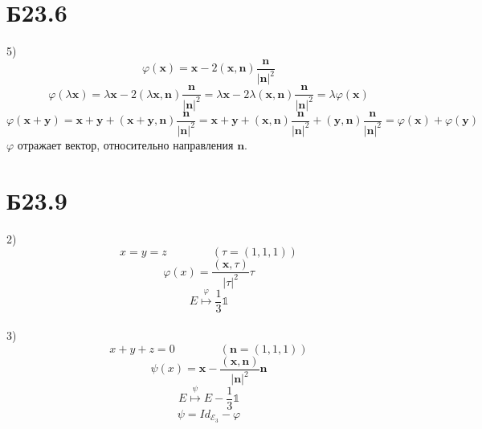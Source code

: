 \documentclass[a4paper,12pt]{article} %
\begin{document}
\section*{Б23.6}5)
$$\varphi(\textbf{x})=\textbf{x}-2(\textbf{x},\textbf{n})\frac{\textbf{n}}{|\textbf{n}|^2}$$
$$\varphi(\lambda\textbf{x})=\lambda\textbf{x}-2(\lambda\textbf{x},\textbf{n})\frac{\textbf{n}}{|\textbf{n}|^2}=\lambda\textbf{x}-2\lambda(\textbf{x},\textbf{n})\frac{\textbf{n}}{|\textbf{n}|^2}=\lambda\varphi(\textbf{x})$$
$$\varphi(\textbf{x}+\textbf{y})=\textbf{x}+\textbf{y}+(\textbf{x}+\textbf{y},\textbf{n})\frac{\textbf{n}}{|\textbf{n}|^2}=\textbf{x}+\textbf{y}+(\textbf{x},\textbf{n})\frac{\textbf{n}}{|\textbf{n}|^2}+(\textbf{y},\textbf{n})\frac{\textbf{n}}{|\textbf{n}|^2}=\varphi(\textbf{x})+\varphi(\textbf{y})$$
$\varphi$ отражает вектор, относительно направления $\textbf{n}$.
\section*{Б23.9}
2)$$x=y=z\qquad\qquad (\tau=(1,1,1))$$
$$\varphi(x)=\frac{(\textbf{x},\tau)}{|\tau|^2}\tau$$
$$E\overset{\varphi}{\mapsto}\frac{1}{3}\mathbb{1}$$
\\
3)$$x+y+z=0\qquad\qquad (\textbf{n}=(1,1,1))$$
$$\psi(x)= \textbf{x}-\frac{(\textbf{x},\textbf{n})}{|\textbf{n}|^2}\textbf{n}$$
$$E\overset{\psi}{\mapsto}E-\frac{1}{3}\mathbb{1}$$
$$\psi=Id_{\mathcal{E}_3}-\varphi$$
\\
\end{document}
